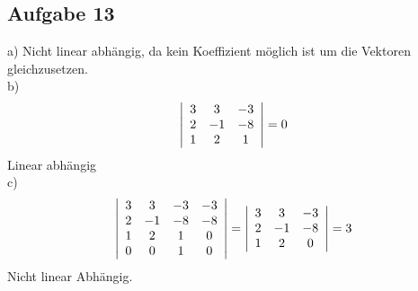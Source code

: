 \documentclass{article}
\begin{document}
\subsection*{Aufgabe 13}
a) Nicht linear abhängig, da kein Koeffizient möglich ist um die Vektoren gleichzusetzen.\\
b)\begin{equation*}
    \left|\begin{array}{c c c}3&3&-3\\2&-1&-8\\1&2&1\end{array}\right| = 0
\end{equation*}
Linear abhängig\\
c)\begin{equation*}
    \left|\begin{array}{c c c c}3&3&-3&-3\\2&-1&-8&-8\\1&2&1&0\\0&0&1&0\end{array}\right| = \left|\begin{array}{c c c}3&3&-3\\2&-1&-8\\1&2&0\end{array}\right| = 3
\end{equation*}
Nicht linear Abhängig.
\end{document}
